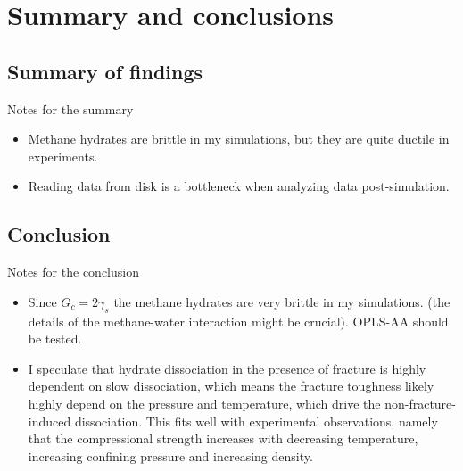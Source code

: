 \chapter{Summary and conclusions}
\label{ch:summary_conclusions}
\section{Summary of findings}
Notes for the summary
\begin{itemize}
\item Methane hydrates are brittle in my simulations, but they are quite ductile in experiments.
\item Reading data from disk is a bottleneck when analyzing data post-simulation. 
\end{itemize}

\section{Conclusion}
Notes for the conclusion
\begin{itemize}
\item Since $G_c = 2\gamma_s$ the methane hydrates are very brittle in my simulations. (the details of the methane-water interaction might be crucial). OPLS-AA should be tested.
\item I speculate that hydrate dissociation in the presence of fracture is highly dependent on slow dissociation, which means the fracture toughness likely highly depend on the pressure and temperature, which drive the non-fracture-induced dissociation. This fits well with experimental observations, namely that the compressional strength increases with decreasing temperature, increasing confining pressure and increasing density.
\end{itemize}


